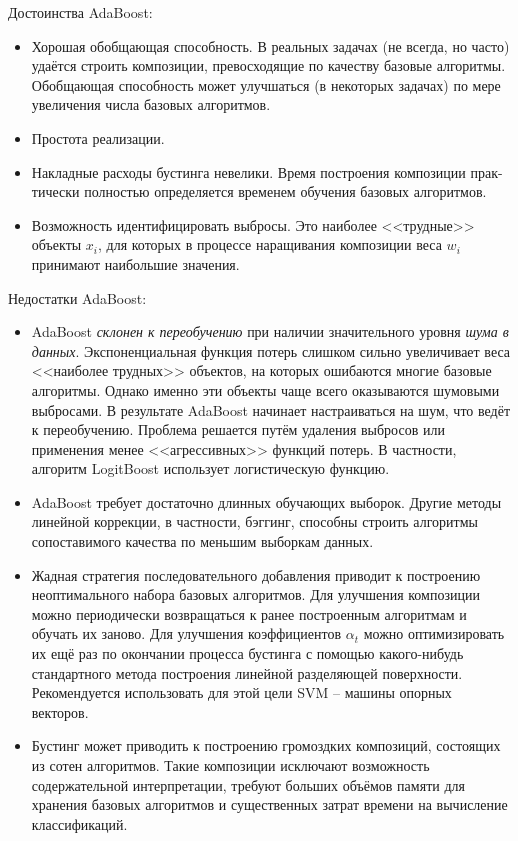 \documentclass[%
	11pt,
	a4paper,
	utf8,
		]{article}
\begin{document}
Достоинства AdaBoost:
\begin{itemize}
	\item Хорошая обобщающая способность. В реальных задачах (не всегда, но часто)
	удаётся строить композиции, превосходящие по качеству базовые алгоритмы.
	Обобщающая способность может улучшаться (в некоторых задачах) по мере
	увеличения числа базовых алгоритмов.
	
	\item Простота реализации.
	
	\item Накладные расходы бустинга невелики. Время построения композиции прак-
	тически полностью определяется временем обучения базовых алгоритмов.
	
	\item Возможность идентифицировать выбросы. Это наиболее <<трудные>> объекты $ x_i $,
	для которых в процессе наращивания композиции веса $ w_i $ принимают наибольшие значения.
\end{itemize}

Недостатки AdaBoost:
\begin{itemize}
	\item AdaBoost \emph{\color{red}склонен к переобучению} при наличии значительного уровня \emph{шума в данных}. Экспоненциальная функция потерь слишком сильно увеличивает веса <<наиболее трудных>> объектов, на которых ошибаются многие базовые алгоритмы. Однако именно эти объекты чаще всего оказываются шумовыми выбросами. В результате AdaBoost начинает настраиваться на шум, что ведёт к переобучению. Проблема решается путём удаления выбросов или применения менее <<агрессивных>> функций потерь. В частности, алгоритм LogitBoost использует логистическую функцию.
	
	\item AdaBoost требует достаточно длинных обучающих выборок. Другие методы
	линейной коррекции, в частности, бэггинг, способны строить алгоритмы сопоставимого качества по меньшим выборкам данных.
	
	\item Жадная стратегия последовательного добавления приводит к построению
	неоптимального набора базовых алгоритмов. Для улучшения композиции можно периодически возвращаться к ранее построенным алгоритмам и обучать их
	заново. Для улучшения коэффициентов $ \alpha_t $ можно оптимизировать их ещё раз по окончании процесса бустинга с помощью какого-нибудь стандартного метода построения линейной разделяющей поверхности. Рекомендуется использовать для этой цели SVM -- машины опорных векторов.
	
	\item Бустинг может приводить к построению громоздких композиций, состоящих
	из сотен алгоритмов. Такие композиции исключают возможность содержательной интерпретации, требуют больших объёмов памяти для хранения базовых
	алгоритмов и существенных затрат времени на вычисление классификаций.
\end{itemize}
\end{document}
